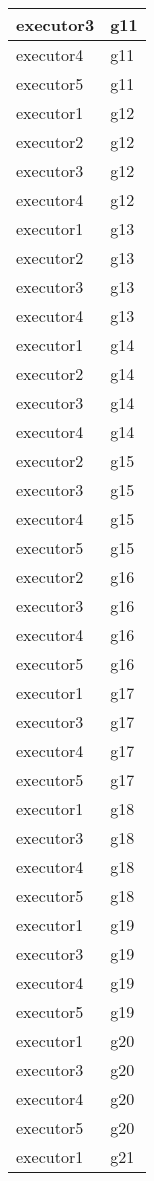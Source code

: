 \begin{center}
\begin{longtable}[H]{|l|l|}
executor3 & g11 \\ \hline
executor4 & g11 \\ \hline
executor5 & g11 \\ \hline
executor1 & g12 \\ \hline
executor2 & g12 \\ \hline
executor3 & g12 \\ \hline
executor4 & g12 \\ \hline
executor1 & g13 \\ \hline
executor2 & g13 \\ \hline
executor3 & g13 \\ \hline
executor4 & g13 \\ \hline
executor1 & g14 \\ \hline
executor2 & g14 \\ \hline
executor3 & g14 \\ \hline
executor4 & g14 \\ \hline
executor2 & g15 \\ \hline
executor3 & g15 \\ \hline
executor4 & g15 \\ \hline
executor5 & g15 \\ \hline
executor2 & g16 \\ \hline
executor3 & g16 \\ \hline
executor4 & g16 \\ \hline
executor5 & g16 \\ \hline
executor1 & g17 \\ \hline
executor3 & g17 \\ \hline
executor4 & g17 \\ \hline
executor5 & g17 \\ \hline
executor1 & g18 \\ \hline
executor3 & g18 \\ \hline
executor4 & g18 \\ \hline
executor5 & g18 \\ \hline
executor1 & g19 \\ \hline
executor3 & g19 \\ \hline
executor4 & g19 \\ \hline
executor5 & g19 \\ \hline
executor1 & g20 \\ \hline
executor3 & g20 \\ \hline
executor4 & g20 \\ \hline
executor5 & g20 \\ \hline
executor1 & g21 \\ \hline

\end{longtable}
\end{center}
